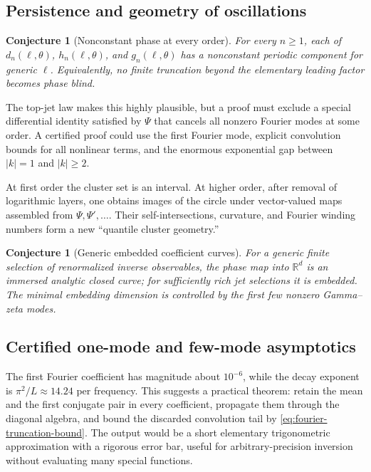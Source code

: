 \documentclass[11pt,oneside]{article}
\numberwithin{equation}{section}
\newtheorem{conjecture}[theorem]{Conjecture}
\theoremstyle{definition}
\theoremstyle{remark}
\newcommand{\R}{\mathbb R}
\begin{document}
\subsection{Persistence and geometry of oscillations}
\begin{conjecture}[Nonconstant phase at every order]
\label{conj:nonconstant}
For every $n\ge1$, each of $d_n(\ell,\theta)$, $h_n(\ell,\theta)$, and $g_n(\ell,\theta)$ has a nonconstant periodic component for generic $\ell$.  Equivalently, no finite truncation beyond the elementary leading factor becomes phase blind.
\end{conjecture}

The top-jet law makes this highly plausible, but a proof must exclude a special differential identity satisfied by $\Psi$ that cancels all nonzero Fourier modes at some order.  A certified proof could use the first Fourier mode, explicit convolution bounds for all nonlinear terms, and the enormous exponential gap between $|k|=1$ and $|k|\ge2$.

At first order the cluster set is an interval.  At higher order, after removal of logarithmic layers, one obtains images of the circle under vector-valued maps assembled from
$\Psi,\Psi',\ldots$.  Their self-intersections, curvature, and Fourier winding numbers form a new ``quantile cluster geometry.''

\begin{conjecture}[Generic embedded coefficient curves]
\label{conj:embedded-curves}
For a generic finite selection of renormalized inverse observables, the phase map into $\R^d$ is an immersed analytic closed curve; for sufficiently rich jet selections it is embedded.  The minimal embedding dimension is controlled by the first few nonzero Gamma--zeta modes.
\end{conjecture}

\subsection{Certified one-mode and few-mode asymptotics}
The first Fourier coefficient has magnitude about $10^{-6}$, while the decay exponent is $\pi^2/L\approx14.24$ per frequency.  This suggests a practical theorem: retain the mean and the first conjugate pair in every coefficient, propagate them through the diagonal algebra, and bound the discarded convolution tail by \cref{eq:fourier-truncation-bound}.  The output would be a short elementary trigonometric approximation with a rigorous error bar, useful for arbitrary-precision inversion without evaluating many special functions.
\end{document}
